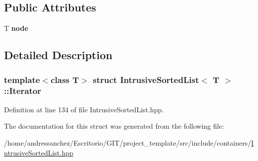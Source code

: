 \subsection*{Public Attributes}
\begin{DoxyCompactItemize}
\item 
\mbox{\label{structIntrusiveSortedList_1_1Iterator_ac93d1a76a9d6cee80dc0fe7a9e66684b}} 
T {\bfseries node}
\end{DoxyCompactItemize}


\subsection{Detailed Description}
\subsubsection*{template$<$class T$>$\newline
struct Intrusive\+Sorted\+List$<$ T $>$\+::\+Iterator}



Definition at line 134 of file Intrusive\+Sorted\+List.\+hpp.



The documentation for this struct was generated from the following file\+:\begin{DoxyCompactItemize}
\item 
/home/andressanchez/\+Escritorio/\+G\+I\+T/project\+\_\+template/src/include/containers/\hyperlink{IntrusiveSortedList_8hpp}{Intrusive\+Sorted\+List.\+hpp}\end{DoxyCompactItemize}
